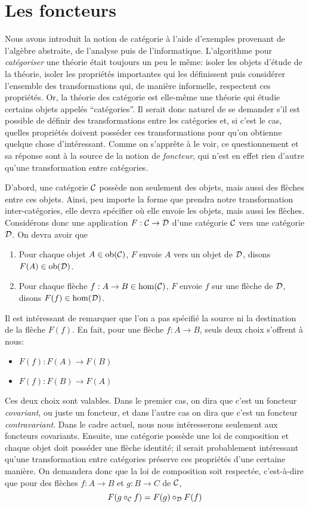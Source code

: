 \section{Les foncteurs}
Nous avons introduit la notion de catégorie à l'aide d'exemples provenant de
l'algèbre abstraite, de l'analyse puis de l'informatique. L'algorithme pour
\textit{catégoriser} une théorie était toujours un peu le même: isoler les
objets d'étude de la théorie, isoler les propriétés importantes qui les
définissent puis considérer l'ensemble des transformations qui, de manière
informelle, respectent ces propriétés. Or, la théorie des catégorie est
elle-même une théorie qui étudie certains objets appelés ``catégories''.
Il serait donc naturel de se demander s'il est possible de définir des
transformations entre les catégories et, si c'est le cas, quelles propriétés
doivent posséder ces transformations pour qu'on obtienne quelque chose
d'intéressant. Comme on s'apprête à le voir, ce questionnement et sa
réponse sont à la source de la notion de \textit{foncteur}, qui n'est
en effet rien d'autre qu'une transformation entre catégories.

D'abord, une catégorie $\mathcal{C}$ possède non seulement des objets, mais aussi
des flèches entre ces objets. Ainsi, peu importe la forme que prendra notre
transformation inter-catégories, elle devra spécifier où elle envoie les
objets, mais aussi les flèches. Considérons donc une application $F : \mathcal{C} \to \mathcal{D}$
d'une catégorie $\mathcal{C}$ vers une catégorie $\mathcal{D}$. On devra avoir que
\begin{enumerate}
    \item Pour chaque objet $A \in \mathrm{ob}(\mathcal{C})$, $F$ envoie $A$ vers un objet de
          $\mathcal{D}$, disons $F(A) \in \mathrm{ob}(\mathcal{D})$.
    \item Pour chaque flèche $f : A \to B \in \hom(\mathcal{C})$, $F$ envoie $f$ sur
          une flèche de $\mathcal{D}$, disons $F(f) \in \hom(\mathcal{D})$.
\end{enumerate}

Il est intéressant de remarquer que l'on a pas spécifié la source ni la
destination de la flèche $F(f)$. En fait, pour une flèche $f : A \to B$,
seuls deux choix s'offrent à nous:
\begin{itemize}
    \item $F(f) : F(A) \to F(B)$
    \item $F(f) : F(B) \to F(A)$
\end{itemize}

Ces deux choix sont valables. Dans le premier cas, on dira que c'est un
foncteur \textit{covariant}, ou juste un foncteur, et dans l'autre cas on
dira que c'est un foncteur \textit{contravariant}. Dans le cadre actuel,
nous nous intéresserons seulement aux foncteurs covariants. Ensuite, une
catégorie possède une loi de composition et chaque objet doit posséder une
flèche identité; il serait probablement intéressant qu'une transformation
entre catégories préserve ces propriétés d'une certaine manière. On demandera
donc que la loi de composition soit respectée, c'est-à-dire que pour des
flèches $f : A \to B$ et $g : B \to C$ de $\mathcal{C}$,
\[
    F(g \circ_{\mathcal{C}} f) = F(g) \circ_{\mathcal{D}} F(f)
\]

